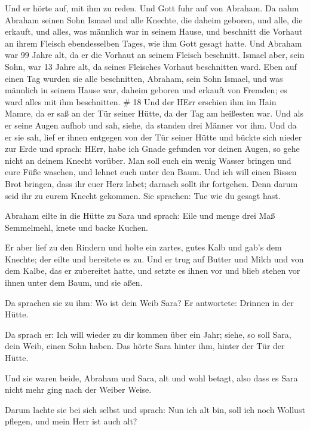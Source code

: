  Und er hörte auf, mit ihm zu reden. Und Gott fuhr auf von
Abraham.  Da nahm Abraham seinen Sohn Ismael und alle
Knechte, die daheim geboren, und alle, die erkauft, und alles, was
männlich war in seinem Hause, und beschnitt die Vorhaut an ihrem Fleisch
ebendesselben Tages, wie ihm Gott gesagt hatte.  Und
Abraham war 99 Jahre alt, da er die Vorhaut an seinem Fleisch beschnitt.
 Ismael aber, sein Sohn, war 13 Jahre alt, da seines
Fleisches Vorhaut beschnitten ward.  Eben auf einen Tag
wurden sie alle beschnitten, Abraham, sein Sohn Ismael, 
und was männlich in seinem Hause war, daheim geboren und erkauft von
Fremden; es ward alles mit ihm beschnitten. \# 18  Und der
HErr erschien ihm im Hain Mamre, da er saß an der Tür seiner Hütte, da
der Tag am heißesten war.  Und als er seine Augen aufhob und
sah, siehe, da standen drei Männer vor ihm. Und da er sie sah, lief er
ihnen entgegen von der Tür seiner Hütte und bückte sich nieder zur Erde
 und sprach: HErr, habe ich Gnade gefunden vor deinen Augen,
so gehe nicht an deinem Knecht vorüber.  Man soll euch ein
wenig Wasser bringen und eure Füße waschen, und lehnet euch unter den
Baum.  Und ich will einen Bissen Brot bringen, dass ihr euer
Herz labet; darnach sollt ihr fortgehen. Denn darum seid ihr zu eurem
Knecht gekommen. Sie sprachen: Tue wie du gesagt hast.

 Abraham eilte in die Hütte zu Sara und sprach: Eile und
menge drei Maß Semmelmehl, knete und backe Kuchen.

 Er aber lief zu den Rindern und holte ein zartes, gutes
Kalb und gab's dem Knechte; der eilte und bereitete es zu. 
Und er trug auf Butter und Milch und von dem Kalbe, das er zubereitet
hatte, und setzte es ihnen vor und blieb stehen vor ihnen unter dem
Baum, und sie aßen.

 Da sprachen sie zu ihm: Wo ist dein Weib Sara? Er
antwortete: Drinnen in der Hütte.

 Da sprach er: Ich will wieder zu dir kommen über ein Jahr;
siehe, so soll Sara, dein Weib, einen Sohn haben. Das hörte Sara hinter
ihm, hinter der Tür der Hütte.

 Und sie waren beide, Abraham und Sara, alt und wohl
betagt, also dass es Sara nicht mehr ging nach der Weiber Weise.

 Darum lachte sie bei sich selbst und sprach: Nun ich alt
bin, soll ich noch Wollust pflegen, und mein Herr ist auch alt?

